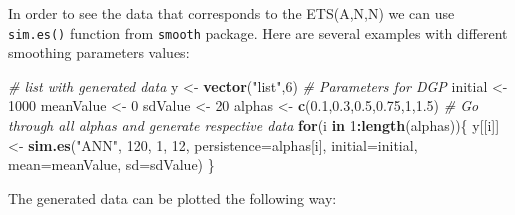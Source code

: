 \documentclass[]{book}
\newenvironment{Shaded}{\begin{snugshade}}{\end{snugshade}}
\newcommand{\CommentTok}[1]{\textcolor[rgb]{0.56,0.35,0.01}{\textit{#1}}}
\newcommand{\ControlFlowTok}[1]{\textcolor[rgb]{0.13,0.29,0.53}{\textbf{#1}}}
\newcommand{\DataTypeTok}[1]{\textcolor[rgb]{0.13,0.29,0.53}{#1}}
\newcommand{\DecValTok}[1]{\textcolor[rgb]{0.00,0.00,0.81}{#1}}
\newcommand{\FloatTok}[1]{\textcolor[rgb]{0.00,0.00,0.81}{#1}}
\newcommand{\KeywordTok}[1]{\textcolor[rgb]{0.13,0.29,0.53}{\textbf{#1}}}
\newcommand{\NormalTok}[1]{#1}
\newcommand{\OperatorTok}[1]{\textcolor[rgb]{0.81,0.36,0.00}{\textbf{#1}}}
\newcommand{\StringTok}[1]{\textcolor[rgb]{0.31,0.60,0.02}{#1}}
\theoremstyle{definition}
\theoremstyle{definition}
\theoremstyle{definition}
\theoremstyle{definition}
\theoremstyle{remark}
\begin{document}
In order to see the data that corresponds to the ETS(A,N,N) we can use \texttt{sim.es()} function from \texttt{smooth} package. Here are several examples with different smoothing parameters values:

\begin{Shaded}
\begin{Highlighting}[]
\CommentTok{# list with generated data}
\NormalTok{y <-}\StringTok{ }\KeywordTok{vector}\NormalTok{(}\StringTok{"list"}\NormalTok{,}\DecValTok{6}\NormalTok{)}
\CommentTok{# Parameters for DGP}
\NormalTok{initial <-}\StringTok{ }\DecValTok{1000}
\NormalTok{meanValue <-}\StringTok{ }\DecValTok{0}
\NormalTok{sdValue <-}\StringTok{ }\DecValTok{20}
\NormalTok{alphas <-}\StringTok{ }\KeywordTok{c}\NormalTok{(}\FloatTok{0.1}\NormalTok{,}\FloatTok{0.3}\NormalTok{,}\FloatTok{0.5}\NormalTok{,}\FloatTok{0.75}\NormalTok{,}\DecValTok{1}\NormalTok{,}\FloatTok{1.5}\NormalTok{)}
\CommentTok{# Go through all alphas and generate respective data}
\ControlFlowTok{for}\NormalTok{(i }\ControlFlowTok{in} \DecValTok{1}\OperatorTok{:}\KeywordTok{length}\NormalTok{(alphas))\{}
\NormalTok{  y[[i]] <-}\StringTok{ }\KeywordTok{sim.es}\NormalTok{(}\StringTok{"ANN"}\NormalTok{, }\DecValTok{120}\NormalTok{, }\DecValTok{1}\NormalTok{, }\DecValTok{12}\NormalTok{, }\DataTypeTok{persistence=}\NormalTok{alphas[i],}
                   \DataTypeTok{initial=}\NormalTok{initial, }\DataTypeTok{mean=}\NormalTok{meanValue, }\DataTypeTok{sd=}\NormalTok{sdValue)}
\NormalTok{\}}
\end{Highlighting}
\end{Shaded}

The generated data can be plotted the following way:

\begin{Shaded}
\end{Shaded}
\end{document}
